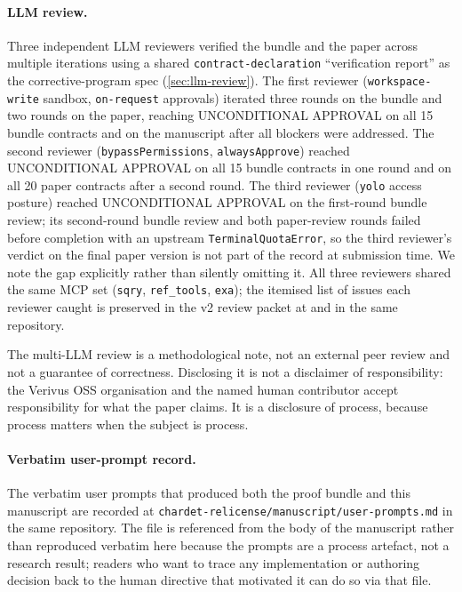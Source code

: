 \documentclass[11pt,letterpaper]{article}
\begin{document}
\paragraph{LLM review.}
Three independent LLM reviewers verified the bundle and the
paper across multiple iterations using a shared
\texttt{contract-declaration} ``verification report'' as the
corrective-program spec (\cref{sec:llm-review}). The first
reviewer (\texttt{workspace-write} sandbox, \texttt{on-request}
approvals) iterated three rounds on the bundle and two rounds on
the paper, reaching UNCONDITIONAL APPROVAL on all 15 bundle
contracts and on the manuscript after all blockers were
addressed. The second reviewer (\texttt{bypassPermissions},
\texttt{alwaysApprove}) reached UNCONDITIONAL APPROVAL on all 15
bundle contracts in one round and on all 20 paper contracts
after a second round. The third reviewer (\texttt{yolo} access
posture) reached UNCONDITIONAL APPROVAL on the first-round
bundle review; its second-round bundle review and both
paper-review rounds failed before completion with an upstream
\texttt{TerminalQuotaError}, so the third reviewer's verdict on
the final paper version is not part of the record at submission
time. We note the gap explicitly rather than silently omitting
it. All three reviewers shared the same MCP set
(\texttt{sqry}, \texttt{ref\_tools}, \texttt{exa}); the itemised
list of issues each reviewer caught is preserved in the v2 review
packet at
and
in the same repository.

The multi-LLM review is a methodological note, not an external
peer review and not a guarantee of correctness. Disclosing it is
not a disclaimer of responsibility: the Verivus OSS organisation
and the named human contributor accept responsibility for what
the paper claims. It is a disclosure of process, because process
matters when the subject is process.

\paragraph{Verbatim user-prompt record.}
The verbatim user prompts that produced both the proof bundle and
this manuscript are recorded at
\texttt{chardet-relicense/manuscript/user-prompts.md} in the same repository. The file is
referenced from the body of the manuscript rather than reproduced
verbatim here because the prompts are a process artefact, not a
research result; readers who want to trace any implementation or
authoring decision back to the human directive that motivated it
can do so via that file.



\end{document}
